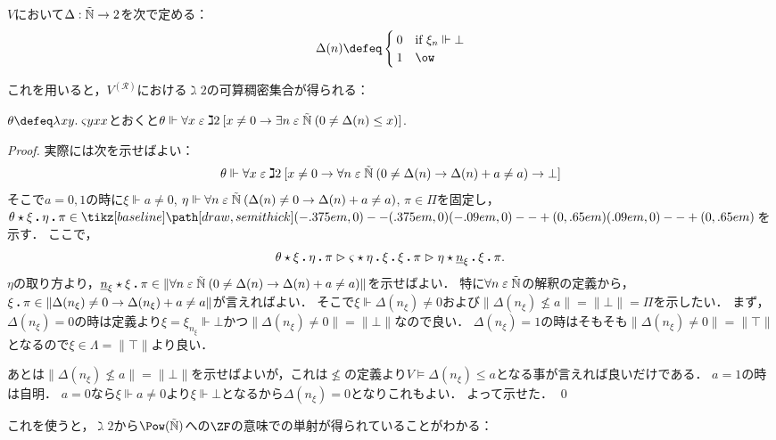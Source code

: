 \documentclass[realisability.tex]{subfiles}
\begin{document}
\begin{definition}[可算実現可能性代数の特性関数]
 $V$において$\Delta: \mathord{\tilde{\mathbb{N}}} \to 2$を次で定める：
 \[
  \Delta(n) \defeq
  \begin{cases}
   0 & \text{if } \xi_n \Vdash \bot\\
   1 & \ow
  \end{cases}
 \]
\end{definition}
これを用いると，$V^{(\mathcal{R})}$における$\gimel 2$の可算稠密集合が得られる：
\begin{lemma}
 $\theta \defeq \abs{xy}{\varsigma y x x}$とおくと$\theta \Vdash \forall x \mathrel{\varepsilon} \gimel 2\:[x \neq 0 \to \exists n \mathrel{\varepsilon} \mathord{\tilde{\mathbb{N}}}\:(0 \neq \Delta(n) \leq x)]$.
\end{lemma}
\begin{proof}
 実際には次を示せばよい：
 \[
  \theta \Vdash \forall x \mathrel{\varepsilon} \gimel 2\:[x \neq 0 \to \forall n \mathrel{\varepsilon} \mathord{\tilde{\mathbb{N}}}\:(0 \neq \Delta(n) \to \Delta(n) + a \neq a) \to \bot]
 \]
 そこで$a = 0, 1$の時に$\xi \Vdash a \neq 0$, $\eta \Vdash \forall n \mathrel{\varepsilon} \mathord{\tilde{\mathbb{N}}}\:(\Delta(n) \neq 0 \to \Delta(n) + a \neq a)$, $\pi \in \Pi$を固定し，$\KVM{{\theta}{\xi}{\eta}{\pi}} \in \pole$を示す．
 ここで，
 \[
  \KVM{{\theta}{\xi}{\eta}{\pi}}
 \reds \KVM{{\varsigma}{\eta}{\xi}{\xi}{\pi}}
 \reds \KVM{\eta {{\num{n}_\xi}} \xi \pi}.
 \]
 $\eta$の取り方より，$\KVM{{{\num{n}_\xi}} \xi \pi} \in \|\forall n \strin \NN\: (0 \neq \Delta(n) \to \Delta(n) + a \neq a) \|$を示せばよい．
 特に$\forall n \mathrel{\varepsilon} \mathord{\tilde{\mathbb{N}}}$の解釈の定義から，$\xi \mathbin{\boldsymbol{.}} \pi \in \|\Delta(n_\xi) \neq 0 \to \Delta(n_\xi) + a \neq a\|$が言えればよい．
 そこで$\xi \Vdash \Delta(n_\xi) \neq 0$および$\|\Delta(n_\xi) \nleq a\| = \|\bot\| = \Pi$を示したい．
 まず，$\Delta(n_\xi) = 0$の時は定義より$\xi = \xi_{n_\xi} \Vdash \bot$かつ$\|\Delta(n_\xi) \neq 0\| = \|\bot\|$なので良い．
 $\Delta(n_\xi) = 1$の時はそもそも$\|\Delta(n_\xi) \neq 0\| = \|\top\|$となるので$\xi \in \Lambda = \|\top\|$より良い．

 あとは$\|\Delta(n_\xi) \nleq a\| = \|\bot\|$を示せばよいが，これは$\nleq$の定義より$V \models \Delta(n_\xi) \leq a$となる事が言えれば良いだけである．
 $a = 1$の時は自明．
 $a = 0$なら$\xi \Vdash a \neq 0$より$\xi \Vdash \bot$となるから$\Delta(n_\xi) = 0$となりこれもよい．
 よって示せた． \qed
\end{proof}

これを使うと，$\gimel 2$から$\Pow(\NN)$への$\ZF$の意味での単射が得られていることがわかる：
\end{document}

